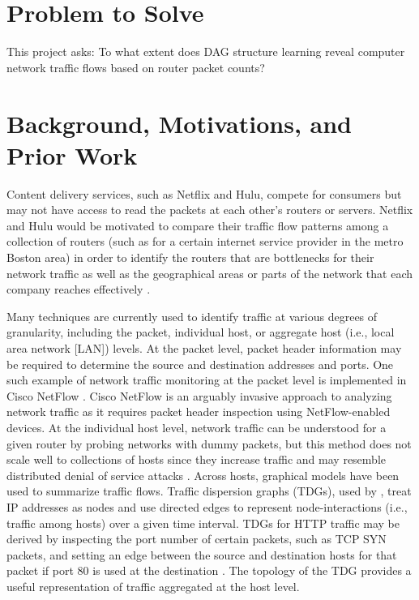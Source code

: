 \documentclass[conference]{IEEEtran}
\begin{document}
\section{Problem to Solve}

This project asks: To what extent does DAG structure learning reveal computer network traffic flows based on router packet counts?

\section{Background, Motivations, and Prior Work}

Content delivery services, such as Netflix and Hulu, compete for consumers but may not have access to read the packets at each other's routers or servers. Netflix and Hulu would be motivated to compare their traffic flow patterns among a collection of routers (such as for a certain internet service provider in the metro Boston area) in order to identify the routers that are bottlenecks for their network traffic as well as the geographical areas or parts of the network that each company reaches effectively \cite{b1}.

Many techniques are currently used to identify traffic at various degrees of granularity, including the packet, individual host, or aggregate host (i.e., local area network [LAN]) levels. At the packet level, packet header information may be required to determine the source and destination addresses and ports. One such example of network traffic monitoring at the packet level is implemented in Cisco NetFlow \cite{b2}. Cisco NetFlow is an arguably invasive approach to analyzing network traffic as it requires packet header inspection using NetFlow-enabled devices. At the individual host level, network traffic can be understood for a given router by probing networks with dummy packets, but this method does not scale well to collections of hosts since they increase traffic and may resemble distributed denial of service attacks \cite{b3}. Across hosts, graphical models have been used to summarize traffic flows. Traffic dispersion graphs (TDGs), used by \cite{b1}, treat IP addresses as nodes and use directed edges to represent node-interactions (i.e., traffic among hosts) over a given time interval. TDGs for HTTP traffic may be derived by inspecting the port number of certain packets, such as TCP SYN packets, and setting an edge between the source and destination hosts for that packet if port 80 is used at the destination \cite{b1}. The topology of the TDG provides a useful representation of traffic aggregated at the host level.
\end{document}
